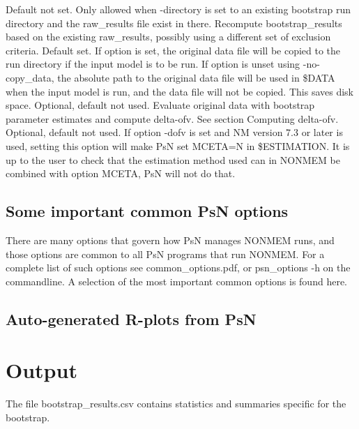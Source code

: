 \begin{optionlist}
\nextopt
{}
Default not set. Only allowed when -directory is set to an existing bootstrap run directory and
the raw\_results file exist in there. Recompute bootstrap\_results based on the existing raw\_results,
possibly using a different set of exclusion criteria.
\nextopt
{}
Default set. If option is set, the original data file
will be copied to the run directory if the input model is to be run.
If option is unset using -no-copy\_data, the absolute path to the original data file will be used in
\$DATA when the input model is run, and the data file will not be copied. This saves disk space.
\nextopt
{}
Optional, default not used. Evaluate original data with bootstrap parameter estimates and compute delta-ofv. See section Computing delta-ofv. 
\nextopt
{}
Optional, default not used. If option -dofv is set and NM version 7.3 or later is used, setting this option will make PsN set MCETA=N in \$ESTIMATION. It is up to the user to check that the estimation method used can in NONMEM be combined with option MCETA, PsN will not do that. 
\nextopt
\end{optionlist}

\subsection{Some important common PsN options}
There are many options that govern how PsN manages NONMEM runs, and
those options are common to all PsN programs that run NONMEM.
For a complete list of such options see common\_options.pdf, 
or psn\_options -h on the commandline. A selection of
the most important common options is found here.


\subsection{Auto-generated R-plots from PsN}
\newcommand{\rplotsconditions}{The default bootstrap template 
requires the xpose4 R library of at least version 4.5.0. 
If the conditions are not fulfilled then no pdf will be generated,
see the .Rout file in the main run directory for error messages.}



\section{Output}

The file bootstrap\_results.csv contains statistics and summaries specific for the bootstrap.

